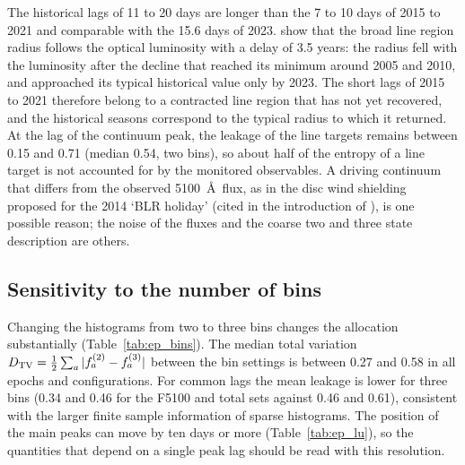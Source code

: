 \documentclass[fleqn,usenatbib]{mnras}
\begin{document}
The historical lags of 11 to 20 days \citep{Lu2022} are longer than the 7 to 10
days of 2015 to 2021 and comparable with the 15.6 days of 2023. \citet{Xi2025}
show that the broad line region radius follows the optical luminosity with a delay of
3.5 years: the radius fell with the luminosity after the decline that reached its
minimum around 2005 and 2010, and approached its typical historical value only by
2023. The short lags of 2015 to 2021 therefore belong to a contracted line region
that has not yet recovered, and the historical seasons correspond to the typical
radius to which it returned. At the lag of the continuum peak, the leakage of the
line targets remains between 0.15 and 0.71 (median 0.54, two bins), so about half of
the entropy of a line target is not accounted for by the monitored observables. A
driving continuum that differs from the observed 5100~\AA\ flux, as in the disc wind
shielding proposed for the 2014 `BLR holiday' (cited in the introduction of
\citealt{Xi2025}), is one possible reason; the noise of the fluxes and the coarse two and three state description are
others.

\subsection{Sensitivity to the number of bins}

Changing the histograms from two to three bins changes the allocation substantially
(Table~\ref{tab:ep_bins}). The median total variation $D_{\rm TV}=\frac12\sum_a|f_a^{(2)}-f_a^{(3)}|$
between the bin settings is between 0.27 and 0.58 in all epochs and
configurations. For common lags the mean leakage is lower for three bins (0.34 and 0.46
for the F5100 and total sets against 0.46 and 0.61), consistent with the larger finite
sample information of sparse histograms. The position of the main peaks can move by
ten days or more (Table~\ref{tab:ep_lu}), so the quantities that depend on a single
peak lag should be read with this resolution.
\end{document}
